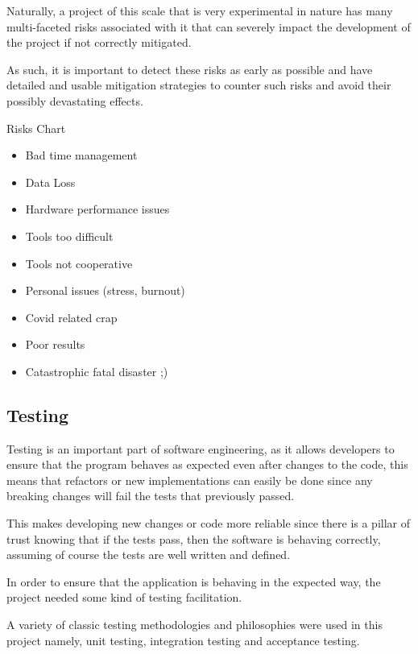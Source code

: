 \documentclass[12pt]{article}
\newcommand{\sentence}{} %
\begin{document}
    \tab
    Naturally, a project of this scale that is very experimental in nature has many multi-faceted risks
    associated with it that can severely impact the development of the project if not correctly mitigated.
    \sentence
    As such, it is important to detect these risks as early as possible and have detailed and usable mitigation
    strategies to counter such risks and avoid their possibly devastating effects.
    \sentence

    \pagebreak
    \thispagestyle{empty}
    \begin{landscape}
        \begin{center}
            \huge{Risks Chart}
            \normalsize
            \begin{itemize}
                \item Bad time management
                \item Data Loss
                \item Hardware performance issues
                \item Tools too difficult
                \item Tools not cooperative
                \item Personal issues (stress, burnout)
                \item Covid related crap
                \item Poor results
                \item Catastrophic fatal disaster ;)
            \end{itemize}
        \end{center}
    \end{landscape}
    \pagebreak

    \subsection{Testing}\label{subsec:testing}

    \tab
    Testing is an important part of software engineering, as it allows developers to ensure that the program behaves
    as expected even after changes to the code, this means that refactors or new implementations can easily be done
    since any breaking changes will fail the tests that previously passed.
    \sentence
    This makes developing new changes or code more reliable since there is a pillar of trust knowing that if the
    tests pass, then the software is behaving correctly, assuming of course the tests are well written and defined.
    \sentence
    In order to ensure that the application is behaving in the expected way, the project needed some kind of
    testing facilitation.
    \sentence
    A variety of classic testing methodologies and philosophies were used in this project namely, unit testing,
    integration testing and acceptance testing.
\end{document}
